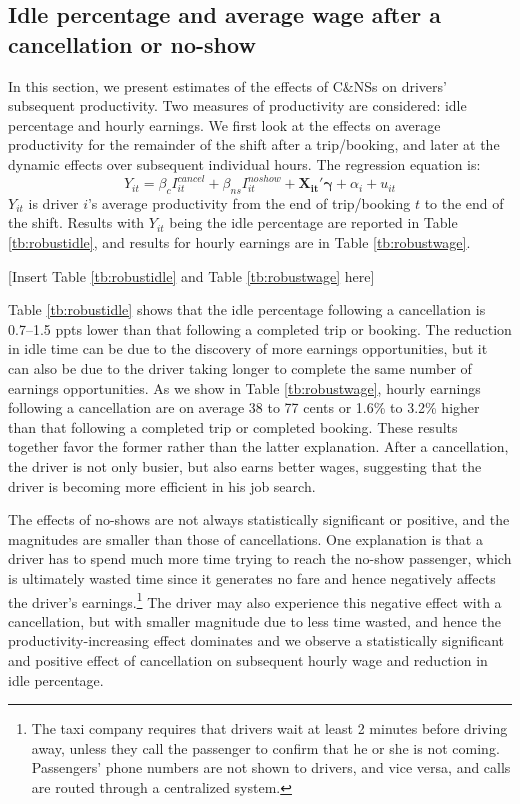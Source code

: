\documentclass[reviewmode]{restud}
\begin{document}
\subsection{Idle percentage and average wage after a cancellation or no-show}
In this section, we present estimates of the effects of C\&NSs on drivers' subsequent productivity. Two measures of productivity are considered: idle percentage and hourly earnings. We first look at the effects on average productivity for the remainder of the shift after a trip/booking, and later at the dynamic effects over subsequent individual hours. The regression equation is:
\begin{equation}
\label{eq:outcomes}
Y_{it} = \beta_c I^{cancel}_{it} + \beta_{ns} I^{noshow}_{it} + \mathbf{X_{it}}'\mathbf{\gamma} + \alpha_i  + u_{it}
\end{equation}
$Y_{it}$ is driver $i$'s average productivity from the end of trip/booking $t$ to the end of the shift. Results with $Y_{it}$ being the idle percentage are reported in Table \ref{tb:robustidle}, and results for hourly earnings are in Table \ref{tb:robustwage}.

\begin{center}
	[Insert Table \ref{tb:robustidle} and Table \ref{tb:robustwage} here]
\end{center}

Table \ref{tb:robustidle} shows that the idle percentage following a cancellation is 0.7--1.5 ppts lower than that following a completed trip or booking. The reduction in idle time can be due to the discovery of more earnings opportunities, but it can also be due to the driver taking longer to complete the same number of earnings opportunities. As we show in Table \ref{tb:robustwage}, hourly earnings following a cancellation are on average 38 to 77 cents or 1.6\% to 3.2\% higher than that following a completed trip or completed booking. These results together favor the former rather than the latter explanation. After a cancellation, the driver is not only busier, but also earns better wages, suggesting that the driver is becoming more efficient in his job search. 

The effects of no-shows are not always statistically significant or positive, and the magnitudes are smaller than those of cancellations. One explanation is that a driver has to spend much more time trying to reach the no-show passenger, which is ultimately wasted time since it generates no fare and hence negatively affects the driver's earnings.\footnote{The taxi company requires that drivers wait at least 2 minutes before driving away, unless they call the passenger to confirm that he or she is not coming. Passengers' phone numbers are not shown to drivers, and vice versa, and calls are routed through a centralized system.} The driver may also experience this negative effect with a cancellation, but with smaller magnitude due to less time wasted, and hence the productivity-increasing effect dominates and we observe a statistically significant and positive effect of cancellation on subsequent hourly wage and reduction in idle percentage.
\end{document}
